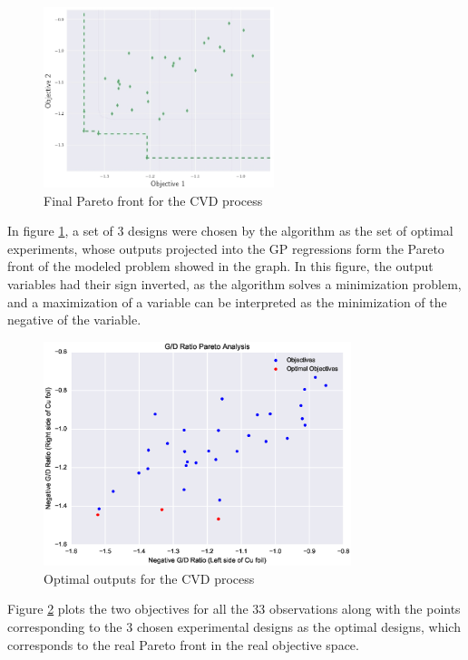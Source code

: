 \documentclass{article}
\begin{document}
\begin{figure}[!t]
\centering
    \includegraphics[width=0.6\textwidth]{ParetoFrontImage}
    \caption{Final Pareto front for the CVD process}
    \label{pareto_cvd}
\label{cvd_pareto}
\end{figure}

In figure \ref{cvd_pareto}, a set of 3 designs were chosen by the algorithm as the set of optimal experiments, whose outputs projected into the GP regressions form the Pareto front of the modeled problem showed in the graph. In this figure, the output variables had their sign inverted, as the algorithm solves a minimization problem, and a maximization of a variable can be interpreted as the minimization of the negative of the variable.

\begin{figure}[!t]
\centering
    \includegraphics[width=0.8\textwidth]{Cu_foil_pareto}
    \caption{Optimal outputs for the CVD process}
    \label{optimal_cvd}
\label{cvd_results}
\end{figure}

Figure \ref{cvd_results} plots the two objectives for all the 33 observations along with the points corresponding to the 3 chosen experimental designs as the optimal designs, which corresponds to the real Pareto front in the real objective space.
\end{document}
